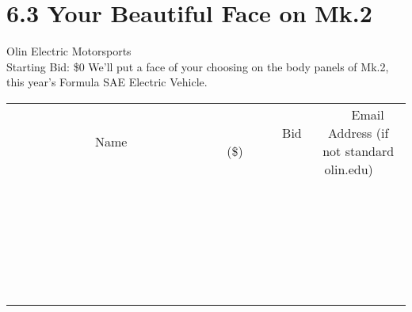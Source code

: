 \documentclass[11pt]{article}
\begin{document}
\section*{6.3 Your Beautiful Face on Mk.2}
Olin Electric Motorsports
\\
Starting Bid: \$0
\newline
We'll put a face of your choosing on the body panels of Mk.2, this year's Formula SAE Electric Vehicle.
\\[6ex]
\begin{tabular}{c c c}
~~~~~~~~~~~~~Name~~~~~~~~~~~~~ & ~~~~~~~~~Bid (\$)~~~~~~~~~  & ~~~Email Address (if not standard olin.edu)~~~\\
 & & \\
\hline
 & & \\
\hline
 & & \\
\hline
 & & \\
\hline
 & & \\
\hline
 & & \\
\hline
 & & \\
\hline
 & & \\
\hline
 & & \\
\hline
 & & \\
\hline
 & & \\
\hline
 & & \\
\hline
 & & \\
\hline
 & & \\
\hline
 & & \\
\hline
 & & \\
\hline
 & & \\
\hline
 & & \\
\hline
 & & \\
\hline
 & & \\
\hline
 & & \\
\hline
 & & \\
\hline
 & & \\
\hline
 & & \\
\hline
 & & \\
\hline
 & & \\
\hline
\end{tabular}
\newpage
\end{document}
